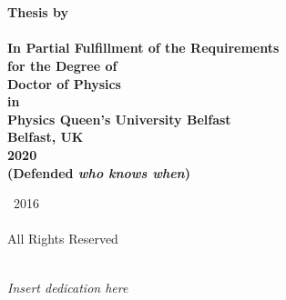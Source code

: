 


\thispagestyle{empty}

\begingroup
\centering
{}
~
\\[1em]
\sffamily\bfseries\fontsize{26}{31.2}\selectfont
\DocumentTitle
\\[0.4in]
\normalfont\large
Thesis by
\\[0.25em]
\sffamily\bfseries\Large
\AuthorName
\\[0.4in]
\normalfont\normalsize
In Partial Fulfillment of the Requirements
\\[0.5em]
for the Degree of
\\[0.5em]
Doctor of Physics
\\[0.5em]
in
\\[0.5em]
Physics
\vfill
Queen's University Belfast
\\[0.5em]
Belfast, UK
\\[1.5em]
2020
\\[0.5em]
(Defended \emph{\textbf{who knows when}})
\par
\endgroup

\clearpage


\pagestyle{plain}
\setcounter{page}{2}

\begingroup
\centering
{}
\null
\vfill
{\sffamily\textcopyright}~2016
\\[0.5em]
\AuthorName
\\[0.5em]
All Rights Reserved
\par
\endgroup

\clearpage


\begingroup
\centering
{}
~
\\[1in]
\textit{Insert dedication here}
\par
\endgroup

